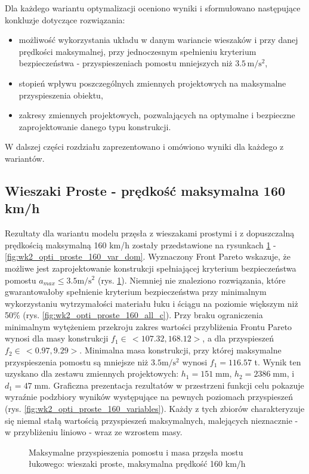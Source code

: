 Dla każdego wariantu optymalizacji oceniono wyniki i sformułowano następujące konkluzje dotyczące rozwiązania:
\begin{itemize}
	\item możliwość wykorzystania układu w danym wariancie wieszaków i przy danej prędkości maksymalnej, przy jednoczesnym spełnieniu kryterium bezpieczeństwa - przyspieszeniach pomostu mniejszych niż $3.5\,\mathrm{m/s^2}$,
	\item stopień wpływu poszczególnych zmiennych projektowych na maksymalne przyspieszenia obiektu,
	\item zakresy zmiennych projektowych, pozwalających na optymalne i bezpieczne zaprojektowanie danego typu konstrukcji.
\end{itemize} 

W dalszej części rozdziału zaprezentowano i omówiono wyniki dla każdego z wariantów.
\vfill
\pagebreak[4]
\subsection{Wieszaki Proste - prędkość maksymalna 160 km/h}

Rezultaty dla wariantu modelu przęsła z wieszakami prostymi i z dopuszczalną prędkością maksymalną 160 km/h zostały przedstawione na rysunkach \ref{fig:wk2_opti_proste_160_all} - \ref{fig:wk2_opti_proste_160_var_dom}. Wyznaczony Front Pareto wskazuje, że możliwe jest zaprojektowanie konstrukcji spełniającej kryterium bezpieczeństwa pomostu $a_{max}\le 3.5 \mathrm{m/s^2}$ (rys. \ref{fig:wk2_opti_proste_160_all}). Niemniej nie znaleziono rozwiązania, które gwarantowałoby spełnienie kryterium bezpieczeństwa przy minimalnym wykorzystaniu wytrzymałości materiału łuku i ściągu na poziomie większym niż 50\% (rys. \ref{fig:wk2_opti_proste_160_all_c}). Przy braku ograniczenia minimalnym wytężeniem przekroju zakres wartości przybliżenia Frontu Pareto wynosi dla masy konstrukcji $f_1 \in\,<107.32,168.12>$, a dla przyspieszeń $f_2 \in\,<0.97,9.29>$. Minimalna masa konstrukcji, przy której maksymalne przyspieszenia pomostu są mniejsze niż $3.5 \mathrm{m/s^2}$ wynosi $f_1 = 116.57$ t. Wynik ten uzyskano dla zestawu zmiennych projektowych: $h_1 = 151\;\mathrm{mm}$, $h_2 = 2386\;\mathrm{mm}$, i $d_1 = 47\;\mathrm{mm}$. Graficzna prezentacja rezultatów w przestrzeni funkcji celu pokazuje wyraźnie podzbiory wyników występujące na pewnych poziomach przyspieszeń (rys. \ref{fig:wk2_opti_proste_160_variables}). Każdy z tych zbiorów charakteryzuje się niemal stałą wartością przyspieszeń maksymalnych, malejących nieznacznie - w przybliżeniu liniowo - wraz ze wzrostem masy.
\begin{figure}[hbt!]
	\centering
	\captionsetup{justification=centering}
	\caption{Maksymalne przyspieszenia pomostu i masa przęsła mostu łukowego: wieszaki proste, maksymalna prędkość 160 km/h}
	\label{fig:wk2_opti_proste_160_all}
\end{figure}

